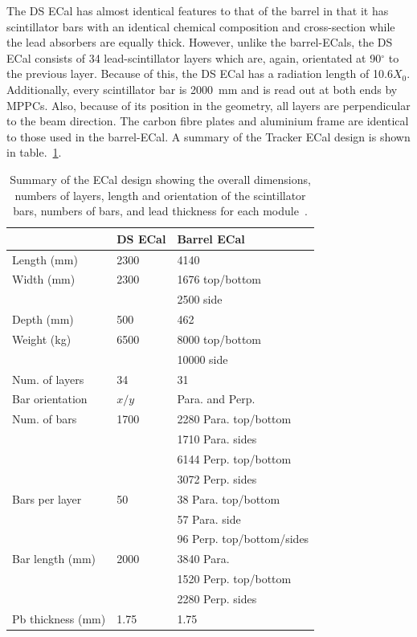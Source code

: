 \newline
\newline
The DS ECal has almost identical features to that of the barrel in that it has scintillator bars with an identical chemical composition and cross-section while the lead absorbers are equally thick.  However, unlike the barrel-ECals, the DS ECal consists of 34 lead-scintillator layers which are, again, orientated at 90$^\circ$ to the previous layer.  Because of this, the DS ECal has a radiation length of 10.6$X_0$.  Additionally, every scintillator bar is 2000~mm and is read out at both ends by MPPCs.  Also, because of its position in the geometry, all layers are perpendicular to the beam direction.  The carbon fibre plates and aluminium frame are identical to those used in the barrel-ECal.
\newline
\newline
A summary of the Tracker ECal design is shown in table.~\ref{table:ECalDesign}.
\begin{table}
\begin{center}
\begin{tabular}{l|l|l}
\hline
        & DS ECal  &Barrel ECal  \\ \hline
Length (mm)& 2300      & 4140   \\ 
Width (mm)  & 2300      & 1676  top/bottom \\ 
        &          & 2500 side  \\ 
Depth (mm)  & 500     & 462    \\
Weight (kg) & 6500 & 8000 top/bottom  \\
            &      & 10000 side        \\ \hline
Num. of layers &  34      &  31  \\ \hline
Bar orientation & $x/y$ &Para. and Perp. \\ \hline
Num. of bars    & 1700     & 2280 Para. top/bottom  \\ 
        &          & 1710 Para. sides \\     
        &          & 6144 Perp. top/bottom   \\ 
        &          & 3072 Perp. sides       \\ \hline  
Bars per layer & 50 & 38 Para. top/bottom\\
               &    & 57 Para. side\\
               &    & 96 Perp. top/bottom/sides  \\  \hline
Bar length (mm) & 2000  & 3840  Para. \\ 
           &      & 1520 Perp. top/bottom \\ 
           &      & 2280 Perp. sides      \\ \hline
Pb thickness (mm) & 1.75  & 1.75    \\ \hline 
\end{tabular}
\caption{Summary of the ECal design showing the overall dimensions, numbers of layers, length and orientation of the scintillator bars, numbers of bars, and lead thickness for each module~\cite{1748-0221-8-10-P10019}.}
\label{table:ECalDesign} 
\end{center}
\end{table}
